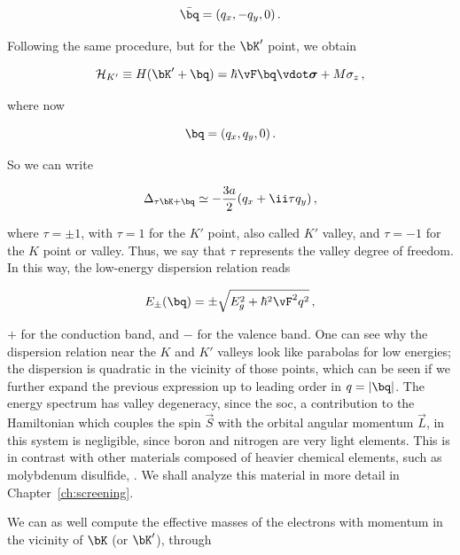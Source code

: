 \begin{equation}
    \bar{\bq} = (q_x,-q_y,0)\,.
\end{equation}

\noindent Following the same procedure, but for the $\bK'$ point, we obtain

\begin{equation}
    \label{eq:low_energy_hamiltonian_hBN_K_prime}
    \mathcal{H}_{K'} \equiv H(\bK' + \bq) = \hbar \vF \bq \vdot \boldsymbol{\sigma} + M \sigma_z\,,
\end{equation}

\noindent where now

\begin{equation}
    \bq = (q_x,q_y,0)\,.
\end{equation}

\noindent So we can write

\begin{equation}
    \Delta_{\tau \bK + \bq} \simeq - \frac{3 a}{2}(q_x+\ii \tau q_y)\,,
\end{equation}

\noindent where $\tau = \pm 1$, with $\tau=1$ for the $K'$ point, also called $K'$ valley, and $\tau = -1$ for the $K$ point or valley.
Thus, we say that $\tau$ represents the valley degree of freedom.
In this way, the low-energy dispersion relation reads

\begin{equation}
    E_{\pm} (\bq) = \pm \sqrt{E_g^2 + \hbar^2 \vF^2 q^2}\,,
\end{equation}

\noindent $+$ for the conduction band, and $-$ for the valence band.
One can see why the dispersion relation near the $K$ and $K'$ valleys look like parabolas for low energies; the dispersion is quadratic in the vicinity of those points, which can be seen if we further expand the previous expression up to leading order in $q = |\bq|$.
The energy spectrum has valley degeneracy, since the \gls{soc}, a contribution to the Hamiltonian which couples the spin $\vec{S}$ with the orbital angular momentum $\vec{L}$, in this system is negligible, since boron and nitrogen are very light elements.
This is in contrast with other materials composed of heavier chemical elements, such as molybdenum disulfide, .
We shall analyze this material in more detail in Chapter~\ref{ch:screening}.

We can as well compute the effective masses of the electrons with momentum in the vicinity of $\bK$ (or $\bK'$), through

